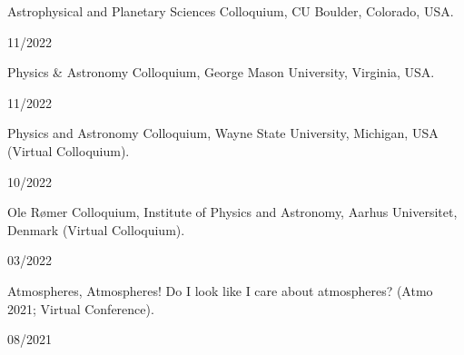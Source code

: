 \documentclass[12pt, a4paper]{article} %
\begin{document}
\begin{minipage}[t]{0.7\textwidth}
\begin{flushleft}%
  \setlength{\leftskip}{0.2cm}%
Astrophysical and Planetary Sciences Colloquium, CU Boulder, Colorado, USA.
\end{flushleft}
\end{minipage}
\begin{minipage}[t]{0.3\textwidth}
\hfill 11/2022
\end{minipage}
\vspace{0.2cm}

\begin{minipage}[t]{0.7\textwidth}
\begin{flushleft}%
  \setlength{\leftskip}{0.2cm}%
Physics \& Astronomy Colloquium, George Mason University, Virginia, USA.
\end{flushleft}
\end{minipage}
\begin{minipage}[t]{0.3\textwidth}
\hfill 11/2022
\end{minipage}
\vspace{0.2cm}

\begin{minipage}[t]{0.7\textwidth}
\begin{flushleft}%
  \setlength{\leftskip}{0.2cm}%
Physics and Astronomy Colloquium, Wayne State University, Michigan, USA (Virtual Colloquium).
\end{flushleft}
\end{minipage}
\begin{minipage}[t]{0.3\textwidth}
\hfill 10/2022
\end{minipage}
\vspace{0.2cm}

\begin{minipage}[t]{0.7\textwidth}
\begin{flushleft}%
  \setlength{\leftskip}{0.2cm}%
Ole Rømer Colloquium, Institute of Physics and Astronomy, Aarhus Universitet, Denmark (Virtual Colloquium).
\end{flushleft}
\end{minipage}
\begin{minipage}[t]{0.3\textwidth}
\hfill 03/2022
\end{minipage}
\vspace{0.2cm}

\begin{minipage}[t]{0.7\textwidth}
\begin{flushleft}%
  \setlength{\leftskip}{0.2cm}%
Atmospheres, Atmospheres! Do I look like I care about atmospheres? (Atmo 2021; Virtual Conference).
\end{flushleft}
\end{minipage}
\begin{minipage}[t]{0.3\textwidth}
\hfill 08/2021
\end{minipage}
\vspace{0.2cm}
\end{document}
